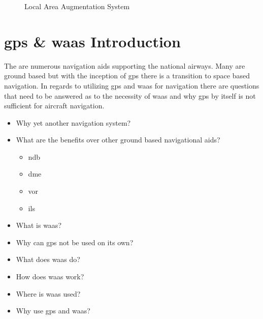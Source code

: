 \begin{figure}
	\centering
	\caption{Local Area Augmentation System}
	\label{fig:FAA_LAAS}
\end{figure}







\section{\ac{gps} \& \ac{waas} Introduction}\label{gps-waas-introduction}

The are numerous navigation aids supporting the national airways. Many
are ground based but with the inception of \ac{gps} there is a transition to space based navigation. In regards to utilizing \ac{gps} and \ac{waas} for navigation there are questions that need to be answered as to the necessity of \ac{waas} and why \ac{gps} by itself is not sufficient for aircraft navigation.

\begin{itemize}
\tightlist
\item
  Why yet another navigation system?
\item
  What are the benefits over other ground based navigational aids?
  \begin{itemize}
  \tightlist
    \item
      \ac{ndb}
    \item
      \ac{dme}
    \item
      \ac{vor}
    \item
      \ac{ils}
  \end{itemize}
\item
  What is \ac{waas}?
\item
  Why can \ac{gps} not be used on its own?
\item
  What does \ac{waas} do?
\item
  How does \ac{waas} work?
\item
  Where is \ac{waas} used?
\item
  Why use \ac{gps} and \ac{waas}?
\end{itemize}

